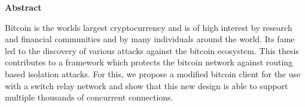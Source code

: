 \clearpage
\null
\vfil %
\thispagestyle{plain}
\begin{center}\textbf{Abstract}\end{center}
Bitcoin is the worlds largest cryptocurrency and is of high interest by research and financial communities and by many individuals around the world. Its fame led to the discovery of various attacks against the bitcoin ecosystem. This thesis contributes to a framework which protects the bitcoin network against routing based isolation attacks. For this, we propose a modified bitcoin client for the use with a switch relay network and show that this new design is able to support multiple thousands of concurrent connections.
\vfil
\clearpage 
